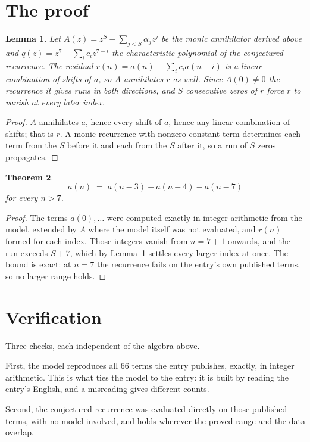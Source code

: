 \documentclass[11pt,a4paper]{article}
\theoremstyle{plain}
\newtheorem{theorem}{Theorem}
\newtheorem{lemma}[theorem]{Lemma}
\theoremstyle{definition}
\begin{document}
\section{The proof}

\begin{lemma}\label{lem:crit}
Let $A(z)=z^S-\sum_{j<S}\alpha_jz^{j}$ be the monic annihilator derived above and
$q(z)=z^{7}-\sum_ic_iz^{7-i}$ the characteristic polynomial of the conjectured
recurrence. The residual $r(n)=a(n)-\sum_ic_ia(n-i)$ is a linear combination of shifts of $a$,
so $A$ annihilates $r$ as well. Since $A(0)\ne0$ the recurrence it gives runs in both
directions, and $S$ consecutive zeros of $r$ force $r$ to vanish at every later index.
\end{lemma}

\begin{proof}
$A$ annihilates $a$, hence every shift of $a$, hence any linear combination of shifts; that is
$r$. A monic recurrence with nonzero constant term determines each term from the $S$ before it
and each from the $S$ after it, so a run of $S$ zeros propagates.
\end{proof}

\begin{theorem}
\[
a(n)\;=\;a(n-3) + a(n-4) - a(n-7)
\]
for every $n>7$.
\end{theorem}

\begin{proof}
The terms $a(0),\dots$ were computed exactly in integer arithmetic from the model, extended by
$A$ where the model itself was not evaluated, and $r(n)$ formed for each index. Those integers
vanish from $n=7+1$ onwards, and the run exceeds $S+7$, which by
Lemma~\ref{lem:crit} settles every larger index at once. The bound is exact: at $n=7$ the recurrence fails on the entry's own published terms, so no larger range holds.
\end{proof}

\section{Verification}

Three checks, each independent of the algebra above.

First, the model reproduces all $66$ terms the entry publishes, exactly, in integer
arithmetic. This is what ties the model to the entry: it is built by reading the entry's
English, and a misreading gives different counts.

Second, the conjectured recurrence was evaluated directly on those published terms, with no
model involved, and holds wherever the proved range and the data overlap.
\end{document}
